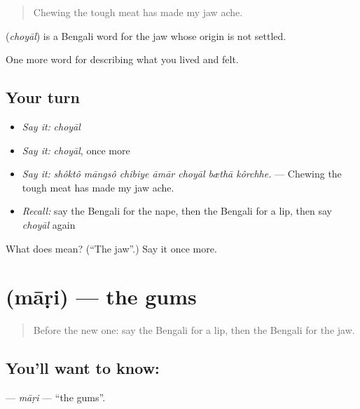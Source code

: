 \begin{quote}
Chewing the tough meat has made my jaw ache.
\end{quote}

\begin{cousinweb}
\textbf{} (\emph{choyāl}) is a Bengali word for the jaw whose origin is not settled.
\end{cousinweb}

\begin{grammarlens}[title={What you've built}]
One more word for describing what you lived and felt.
\end{grammarlens}

\subsection*{Your turn}
\begin{itemize}
\raggedright
  \item \emph{Say it:} \emph{choyāl}
  \item \emph{Say it:} \emph{choyāl}, once more
  \item \emph{Say it:} \emph{shôktô māngsô chibiye āmār choyāl bæthā kôrchhe.} — Chewing the tough meat has made my jaw ache.
  \item \emph{Recall:} say the Bengali for the nape, then the Bengali for a lip, then say \emph{choyāl} again
\end{itemize}

\begin{tcolorbox}[breakable,colback=teal!4,colframe=teal!35!black,title={Before you move on}]
What does  mean? (\textquotedblleft{}The jaw\textquotedblright{}.) Say it once more.
\end{tcolorbox}
\section[\texorpdfstring{\bn{মাড়ি} (māṛi)}{মাড়ি (māṛi)}]{ (māṛi) — the gums}

\label{lesson:BN-C467-mari}



\begin{quote}
Before the new one: say the Bengali for a lip, then the Bengali for the jaw.
\end{quote}

\subsection*{You'll want to know: }
\textbf{} — \emph{māṛi} — \textquotedblleft{}the gums\textquotedblright{}.

